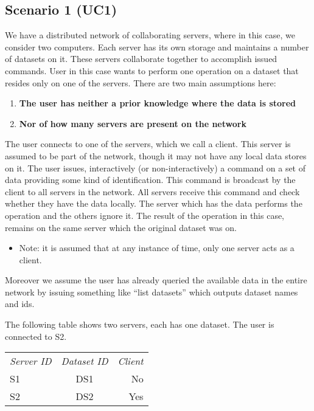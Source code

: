\subsection{Scenario 1 (UC1)}
We have a distributed network of collaborating servers, where in this case, we consider two computers. 
Each server has its own storage and maintains a number of datasets on it. These servers collaborate 
together to accomplish issued commands. User in this case wants to perform one operation on a dataset
that resides only on one of the servers. There are two main assumptions here:
\begin{enumerate}
\item \textbf{The user has neither a prior knowledge where the data is stored}
\item \textbf{Nor of how many servers are present on the network}
\end{enumerate}

The user connects to one of the servers, which we call a client. This server is assumed to be part 
of the network, though it may not have any local data stores on it. The user issues, interactively
(or non-interactively) a command on a set of data providing some kind of identification. This command
is broadcast by the client to all servers in the network. All servers receive this command and check
whether they have the data locally. The server which has the data performs the operation and the others
ignore it. The result of the operation in this case, remains on the same server which the original 
dataset was on. 

\begin{itemize}
\item Note: it is assumed that at any instance of time, only one server acts as a client.
\end{itemize}

Moreover we assume the user has already queried the available data in the entire network by 
issuing something like “list datasets” which outputs dataset names and ids.

The following table shows two servers, each has one dataset. The user is connected to S2.\\

\begin{tabular}{ l c r }
\em{Server ID} & \em{ Dataset ID} & \em{ Client} \\
S1 & DS1 & No \\
S2 & DS2 & Yes \\
\end{tabular}\\

